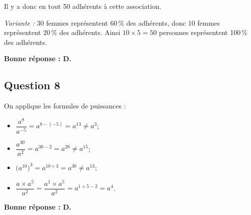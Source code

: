 	Il y a donc en tout 50 adhérents à cette association.

	\emph{Variante :} 30 femmes représentent 60\,\% des adhérents, donc 10 femmes représentent 20\,\% des adhérents. Ainsi $10 \times 5 = 50$ personnes représentent 100\,\% des adhérents.

	\textbf{Bonne réponse : D.}

\subsection*{Question 8}
	On applique les formules de puissances :
	\begin{itemize}
		\item $\dfrac{a^8}{a^{-5}} = a^{8 - (-5)} = a^{13} \neq a^3$;
		\item $\dfrac{a^{30}}{a^2} = a^{30 - 2} = a^{28} \neq a^{15}$;
		\item $\big(a^{10}\big)^3 = a^{10 \times 3} = a^{30} \neq a^{13}$;
		\item $\dfrac{a\times a^5}{a^2} = \dfrac{a^1\times a^5}{a^2} = a^{1 + 5 - 2} = a^4$.
	\end{itemize}

	\textbf{Bonne réponse : D.}

